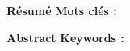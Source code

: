 

\thispagestyle{backcover}

\begin{changemargin}{3mm}{0cm}
    \begin{minipage}[c]{0.96\columnwidth}
        
        
        
        {\LARGE\textbf{Résumé}}
        \vskip1mm
            \begingroup
                \large
                \@frenchAbstract
            \endgroup
        \vskip1mm
        {\textbf{Mots clés : }
            \begingroup
                \@frenchAbstractKeywords
            \endgroup
        }
        
        {
        {%
            \vskip5mm
        }{\vskip8mm}}
        
        {\LARGE\textbf{Abstract}}
        \vskip1mm
            \begingroup
                \large
                \@englishAbstract
            \endgroup
        \vskip1mm
        {\textbf{Keywords : }
            \begingroup
                \@englishAbstractKeywords
            \endgroup
        }
    \end{minipage}
    
\end{changemargin}